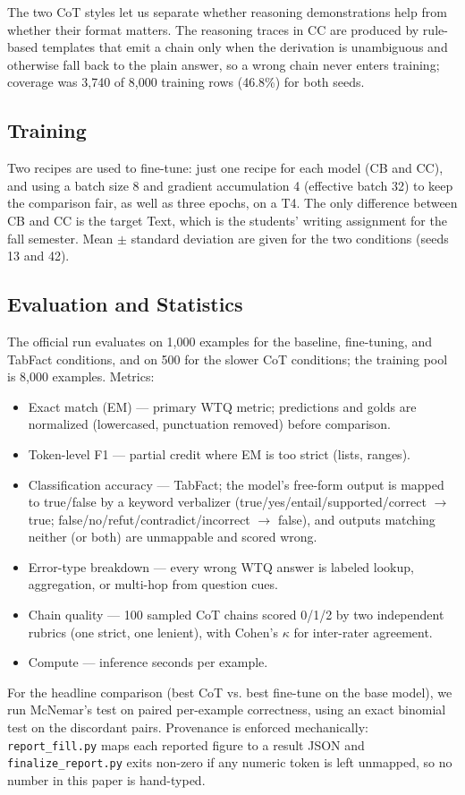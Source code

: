 \documentclass[sigconf]{acmart}
\begin{document}
The two CoT styles let us separate whether reasoning demonstrations help from whether their format matters. The reasoning traces in CC are produced by rule-based templates that emit a chain only when the derivation is unambiguous and otherwise fall back to the plain answer, so a wrong chain never enters training; coverage was 3,740 of 8,000 training rows (46.8\%) for both seeds.

\subsection{Training}
Two recipes are used to fine-tune: just one recipe for each model (CB and CC), and using a batch size 8 and gradient accumulation 4 (effective batch 32) to keep the comparison fair, as well as three epochs, on a T4. The only difference between CB and CC is the target Text, which is the students' writing assignment for the fall semester. Mean $\pm$ standard deviation are given for the two conditions (seeds 13 and 42).

\subsection{Evaluation and Statistics}
The official run evaluates on 1,000 examples for the baseline, fine-tuning, and TabFact conditions, and on 500 for the slower CoT conditions; the training pool is 8,000 examples. Metrics:
\begin{itemize}
  \item Exact match (EM) --- primary WTQ metric; predictions and golds are normalized (lowercased, punctuation removed) before comparison.
  \item Token-level F1 --- partial credit where EM is too strict (lists, ranges).
  \item Classification accuracy --- TabFact; the model's free-form output is mapped to true/false by a keyword verbalizer (true/\allowbreak yes/\allowbreak entail/\allowbreak supported/\allowbreak correct $\rightarrow$ true; false/\allowbreak no/\allowbreak refut/\allowbreak contradict/\allowbreak incorrect $\rightarrow$ false), and outputs matching neither (or both) are unmappable and scored wrong.
  \item Error-type breakdown --- every wrong WTQ answer is labeled lookup, aggregation, or multi-hop from question cues.
  \item Chain quality --- 100 sampled CoT chains scored 0/1/2 by two independent rubrics (one strict, one lenient), with Cohen's $\kappa$ for inter-rater agreement.
  \item Compute --- inference seconds per example.
\end{itemize}
For the headline comparison (best CoT vs. best fine-tune on the base model), we run McNemar's test on paired per-example correctness, using an exact binomial test on the discordant pairs. Provenance is enforced mechanically: \texttt{report\_fill.py} maps each reported figure to a result JSON and \texttt{finalize\_report.py} exits non-zero if any numeric token is left unmapped, so no number in this paper is hand-typed.
\end{document}
